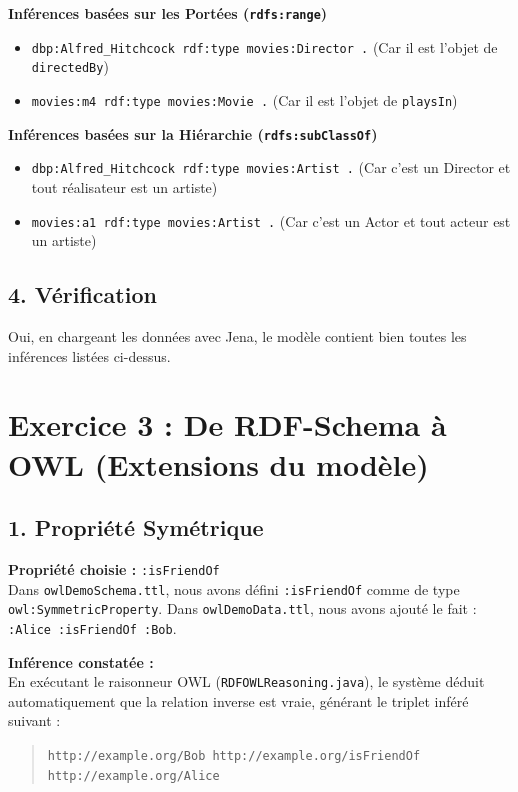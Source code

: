 \documentclass[11pt,a4paper]{article}
\begin{document}
\textbf{Inférences basées sur les Portées (\texttt{rdfs:range})}
\begin{itemize}
    \item \texttt{dbp:Alfred\_Hitchcock rdf:type movies:Director .} (Car il est l'objet de \texttt{directedBy})
    \item \texttt{movies:m4 rdf:type movies:Movie .} (Car il est l'objet de \texttt{playsIn})
\end{itemize}

\textbf{Inférences basées sur la Hiérarchie (\texttt{rdfs:subClassOf})}
\begin{itemize}
    \item \texttt{dbp:Alfred\_Hitchcock rdf:type movies:Artist .} (Car c'est un Director et tout réalisateur est un artiste)
    \item \texttt{movies:a1 rdf:type movies:Artist .} (Car c'est un Actor et tout acteur est un artiste)
\end{itemize}

\subsection*{4. Vérification}
Oui, en chargeant les données avec Jena, le modèle contient bien toutes les inférences listées ci-dessus.

\newpage

\section*{Exercice 3 : De RDF-Schema à OWL (Extensions du modèle)}

\subsection*{1. Propriété Symétrique}
\textbf{Propriété choisie :} \texttt{:isFriendOf} \\
Dans \texttt{owlDemoSchema.ttl}, nous avons défini \texttt{:isFriendOf} comme de type \texttt{owl:SymmetricProperty}.
Dans \texttt{owlDemoData.ttl}, nous avons ajouté le fait : \texttt{:Alice :isFriendOf :Bob}.

\textbf{Inférence constatée :} \\
En exécutant le raisonneur OWL (\texttt{RDFOWLReasoning.java}), le système déduit automatiquement que la relation inverse est vraie, générant le triplet inféré suivant :
\begin{quote}
\texttt{http://example.org/Bob http://example.org/isFriendOf http://example.org/Alice}
\end{quote}
\end{document}
